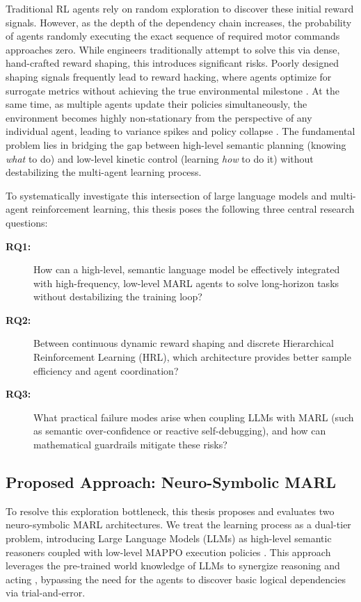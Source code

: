 Traditional RL agents rely on random exploration to discover these initial reward signals. However, as the depth of the dependency chain increases, the probability of agents randomly executing the exact sequence of required motor commands approaches zero. While engineers traditionally attempt to solve this via dense, hand-crafted reward shaping, this introduces significant risks. Poorly designed shaping signals frequently lead to reward hacking, where agents optimize for surrogate metrics without achieving the true environmental milestone \parencite{ma2024eurekahumanlevelrewarddesign}. At the same time, as multiple agents update their policies simultaneously, the environment becomes highly non-stationary from the perspective of any individual agent, leading to variance spikes and policy collapse \parencite{Lowe_Wu_Tamar_Harb_Abbeel_Mordatch_2017}. The fundamental problem lies in bridging the gap between high-level semantic planning (knowing \emph{what} to do) and low-level kinetic control (learning \emph{how} to do it) without destabilizing the multi-agent learning process.

To systematically investigate this intersection of large language models and multi-agent reinforcement learning, this thesis poses the following three central research questions:

\begin{description}
    \item[\textbf{RQ1:}] How can a high-level, semantic language model be effectively integrated with high-frequency, low-level MARL agents to solve long-horizon tasks without destabilizing the training loop?
    \item[\textbf{RQ2:}] Between continuous dynamic reward shaping and discrete Hierarchical Reinforcement Learning (HRL), which architecture provides better sample efficiency and agent coordination?
    \item[\textbf{RQ3:}] What practical failure modes arise when coupling LLMs with MARL (such as semantic over-confidence or reactive self-debugging), and how can mathematical guardrails mitigate these risks?
\end{description}

\subsection{Proposed Approach: Neuro-Symbolic MARL}
\label{sec:proposed_approach}

To resolve this exploration bottleneck, this thesis proposes and evaluates two neuro-symbolic MARL architectures. We treat the learning process as a dual-tier problem, introducing Large Language Models (LLMs) as high-level semantic reasoners coupled with low-level MAPPO execution policies \parencite{Yu_Velu_Vinitsky_Gao_Wang_Bayen_Wu_2022}. This approach leverages the pre-trained world knowledge of LLMs to synergize reasoning and acting \parencite{Yao_Zhao_Yu_Du_Shafran_Narasimhan_Cao_2023}, bypassing the need for the agents to discover basic logical dependencies via trial-and-error.

